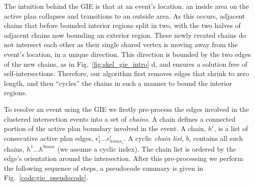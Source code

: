 The intuition behind the GIE is that at an event's location, an inside area on the active plan collapses and transitions to an outside area. As this occurs, adjacent chains that before bounded interior regions split in two, with the two halves of adjacent chains now bounding an exterior region. These newly created chains do not intersect each other as their single shared vertex is moving away from the event's location, in a unique direction. This direction is bounded by the two edges of the new chains, as in Fig.~\ref{fig:skel_gie_intro} d, and ensures a solution free of self-intersections. Therefore, our algorithm first removes edges that shrink to zero length, and then ``cycles'' the chains in such a manner to bound the interior regions.

To resolve an event using the GIE we firstly pre-process the edges involved in the clustered intersection events into a set of \emph{chains}. A chain defines a connected portion of the active plan boundary involved in the event. A chain, $h^i$, is a list of consecutive active plan edges, $\epsilon^i_1...\epsilon^i_{hmax_i}$. A cyclic \emph{chain list}, $b$, contains all such chains, $h^1...h^{bmax}$ (we assume a cyclic index). The chain list is ordered by the edge's orientation around the intersection. After this pre-processing we perform the following sequence of steps, a pseudocode summary is given in Fig.~\ref{code:gie_pseudocode}. 

